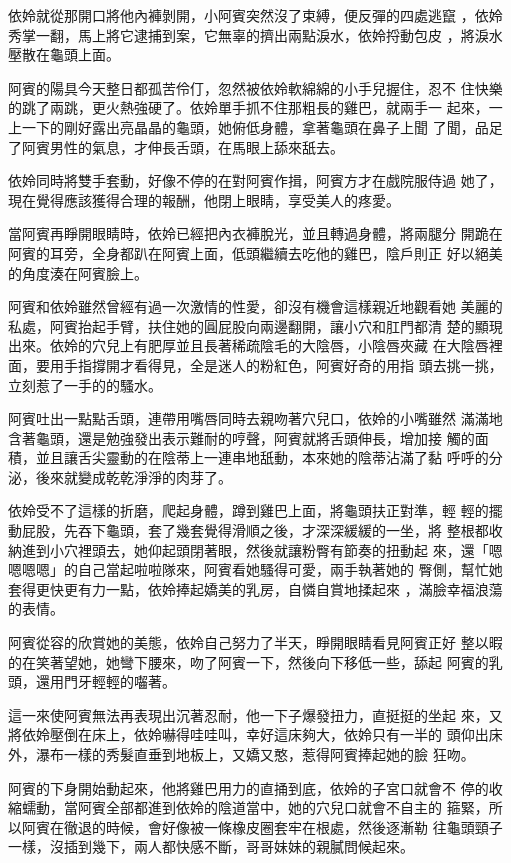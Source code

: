 依姈就從那開口將他內褲剝開，小阿賓突然沒了束縛，便反彈的四處逃竄
，依姈秀掌一翻，馬上將它逮捕到案，它無辜的擠出兩點淚水，依姈捋動包皮
，將淚水壓散在龜頭上面。

阿賓的陽具今天整日都孤苦伶仃，忽然被依姈軟綿綿的小手兒握住，忍不
住快樂的跳了兩跳，更火熱強硬了。依姈單手抓不住那粗長的雞巴，就兩手一
起來，一上一下的剛好露出亮晶晶的龜頭，她俯低身體，拿著龜頭在鼻子上聞
了聞，品足了阿賓男性的氣息，才伸長舌頭，在馬眼上舔來舐去。

依姈同時將雙手套動，好像不停的在對阿賓作揖，阿賓方才在戲院服侍過
她了，現在覺得應該獲得合理的報酬，他閉上眼睛，享受美人的疼愛。

當阿賓再睜開眼睛時，依姈已經把內衣褲脫光，並且轉過身體，將兩腿分
開跪在阿賓的耳旁，全身都趴在阿賓上面，低頭繼續去吃他的雞巴，陰戶則正
好以絕美的角度湊在阿賓臉上。

阿賓和依姈雖然曾經有過一次激情的性愛，卻沒有機會這樣親近地觀看她
美麗的私處，阿賓抬起手臂，扶住她的圓屁股向兩邊翻開，讓小穴和肛門都清
楚的顯現出來。依姈的穴兒上有肥厚並且長著稀疏陰毛的大陰唇，小陰唇夾藏
在大陰唇裡面，要用手指撐開才看得見，全是迷人的粉紅色，阿賓好奇的用指
頭去挑一挑，立刻惹了一手的的騷水。

阿賓吐出一點點舌頭，連帶用嘴唇同時去親吻著穴兒口，依姈的小嘴雖然
滿滿地含著龜頭，還是勉強發出表示難耐的哼聲，阿賓就將舌頭伸長，增加接
觸的面積，並且讓舌尖靈動的在陰蒂上一連串地舐動，本來她的陰蒂沾滿了黏
呼呼的分泌，後來就變成乾乾淨淨的肉芽了。

依姈受不了這樣的折磨，爬起身體，蹲到雞巴上面，將龜頭扶正對準，輕
輕的擺動屁股，先吞下龜頭，套了幾套覺得滑順之後，才深深緩緩的一坐，將
整根都收納進到小穴裡頭去，她仰起頭閉著眼，然後就讓粉臀有節奏的扭動起
來，還「嗯嗯嗯嗯」的自己當起啦啦隊來，阿賓看她騷得可愛，兩手執著她的
臀側，幫忙她套得更快更有力一點，依姈捧起嬌美的乳房，自憐自賞地揉起來
，滿臉幸福浪蕩的表情。

阿賓從容的欣賞她的美態，依姈自己努力了半天，睜開眼睛看見阿賓正好
整以暇的在笑著望她，她彎下腰來，吻了阿賓一下，然後向下移低一些，舔起
阿賓的乳頭，還用門牙輕輕的囓著。

這一來使阿賓無法再表現出沉著忍耐，他一下子爆發扭力，直挺挺的坐起
來，又將依姈壓倒在床上，依姈嚇得哇哇叫，幸好這床夠大，依姈只有一半的
頭仰出床外，瀑布一樣的秀髮直垂到地板上，又嬌又憨，惹得阿賓捧起她的臉
狂吻。

阿賓的下身開始動起來，他將雞巴用力的直捅到底，依姈的子宮口就會不
停的收縮蠕動，當阿賓全部都進到依姈的陰道當中，她的穴兒口就會不自主的
箍緊，所以阿賓在徹退的時候，會好像被一條橡皮圈套牢在根處，然後逐漸勒
往龜頭頸子一樣，沒插到幾下，兩人都快感不斷，哥哥妹妹的親膩問候起來。

